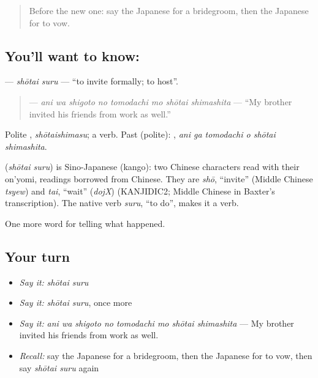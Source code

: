 \begin{quote}
Before the new one: say the Japanese for a bridegroom, then the Japanese for to vow.
\end{quote}

\subsection*{You'll want to know: }
\textbf{} — \emph{shōtai suru} — \textquotedblleft{}to invite formally; to host\textquotedblright{}.

\begin{quote}
\textbf{   } — \emph{ani wa shigoto no tomodachi mo shōtai shimashita} — \textquotedblleft{}My brother invited his friends from work as well.\textquotedblright{}
\end{quote}

Polite \textbf{}, \emph{shōtaishimasu}; a  verb. Past (polite): \textbf{  }, \emph{ani ga tomodachi o shōtai shimashita}.

\begin{cousinweb}
\textbf{} (\emph{shōtai suru}) is Sino-Japanese (kango): two Chinese characters read with their on'yomi, readings borrowed from Chinese. They are \emph{shō}, \textquotedblleft{}invite\textquotedblright{} (Middle Chinese \emph{tsyew}) and \emph{tai}, \textquotedblleft{}wait\textquotedblright{} (\emph{dojX}) (KANJIDIC2; Middle Chinese in Baxter's transcription). The native verb \emph{suru}, \textquotedblleft{}to do\textquotedblright{}, makes it a verb.
\end{cousinweb}

\begin{grammarlens}[title={What you've built}]
One more word for telling what happened.
\end{grammarlens}

\subsection*{Your turn}
\begin{itemize}
\raggedright
  \item \emph{Say it:} \emph{shōtai suru}
  \item \emph{Say it:} \emph{shōtai suru}, once more
  \item \emph{Say it:} \emph{ani wa shigoto no tomodachi mo shōtai shimashita} — My brother invited his friends from work as well.
  \item \emph{Recall:} say the Japanese for a bridegroom, then the Japanese for to vow, then say \emph{shōtai suru} again
\end{itemize}


